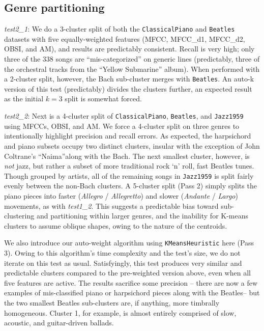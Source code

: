 \documentclass[12pt,twocolumn,titlepage]{article}
\begin{document}
\subsection{Genre partitioning}

\emph{test2\_1}: We do a 3-cluster split of both the \texttt{ClassicalPiano} and \texttt{Beatles} datasets with five equally-weighted features (MFCC, MFCC\_d1, MFCC\_d2, OBSI, and AM), and results are predictably consistent. Recall is very high; only three of the 338 songs are ``mis-categorized'' on generic lines (predictably, three of the orchestral tracks from the ``Yellow Submarine'' album). When performed with a 2-cluster split, however, the Bach sub-cluster merges with \texttt{Beatles}. An auto-k version of this test (predictably) divides the clusters further, an expected result as the initial $k=3$ split is somewhat forced.

\emph{test2\_2}: Next is a 4-cluster split of \texttt{ClassicalPiano}, \texttt{Beatles}, and \texttt{Jazz1959} using MFCCs, OBSI, and AM. We force a 4-cluster split on three genres to intentionally highlight precision and recall errors. As expected, the harpsichord and piano subsets occupy two distinct clusters, insular with the exception of John Coltrane's ``Naima''along with the Bach. The next smallest cluster, however, is \emph{not} jazz, but rather a subset of more traditional rock `n' roll, fast Beatles tunes. Though grouped by artists, all of the remaining songs in \texttt{Jazz1959} is split fairly evenly between the non-Bach clusters. A 5-cluster split (Pass 2) simply splits the piano pieces into faster (\emph{Allegro} / \emph{Allegretto}) and slower (\emph{Andante} / \emph{Largo}) movements, as with \emph{test1\_2}. This suggests a predictable bias toward sub-clustering and partitioning within larger genres, and the inability for K-means clusters to assume oblique shapes, owing to the nature of the centroids.

We also introduce our auto-weight algorithm using \texttt{KMeansHeuristic} here (Pass 3). Owing to this algorithm's time complexity and the test's size, we do not iterate on this test as usual. Satisfyingly, this test produces very similar and predictable clusters compared to the pre-weighted version above, even when all five features are active. The results sacrifice some precision -- there are now a few examples of mis-classified piano or harpsichord pieces along with the Beatles-- but the two smallest Beatles sub-clusters are, if anything, more timbrally homogeneous. Cluster 1, for example, is almost entirely comprised of slow, acoustic, and guitar-driven ballads.
\end{document}
